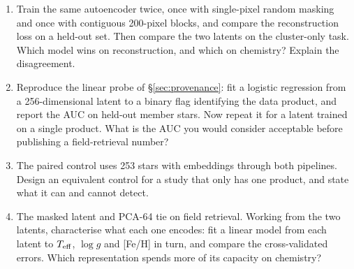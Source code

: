 \begin{issues}[EXERCISES]
\begin{enumerate}
\item Train the same autoencoder twice, once with single-pixel random masking
  and once with contiguous 200-pixel blocks, and compare the reconstruction
  loss on a held-out set. Then compare the two latents on the cluster-only task.
  Which model wins on reconstruction, and which on chemistry? Explain the
  disagreement.
\item Reproduce the linear probe of \S\ref{sec:provenance}: fit a logistic
  regression from a 256-dimensional latent to a binary flag identifying the
  data product, and report the AUC on held-out member stars. Now repeat it for
  a latent trained on a single product. What is the AUC you would consider
  acceptable before publishing a field-retrieval number?
\item The paired control uses 253 stars with embeddings through both pipelines.
  Design an equivalent control for a study that only has one product, and
  state what it can and cannot detect.
\item The masked latent and PCA-64 tie on field retrieval. Working from the
  two latents, characterise what each one encodes: fit a linear model from
  each latent to $T_{\rm eff}$, $\log g$ and [Fe/H] in turn, and compare the
  cross-validated errors. Which representation spends more of its capacity on
  chemistry?
\end{enumerate}
\end{issues}
